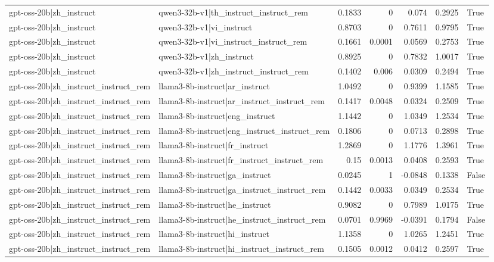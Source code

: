 \begin{table}
\begin{tabular}{l l r r r r l}
gpt-oss-20b|zh_instruct & qwen3-32b-v1|th_instruct_instruct_rem & 0.1833 & 0 & 0.074 & 0.2925 & True \\
gpt-oss-20b|zh_instruct & qwen3-32b-v1|vi_instruct & 0.8703 & 0 & 0.7611 & 0.9795 & True \\
gpt-oss-20b|zh_instruct & qwen3-32b-v1|vi_instruct_instruct_rem & 0.1661 & 0.0001 & 0.0569 & 0.2753 & True \\
gpt-oss-20b|zh_instruct & qwen3-32b-v1|zh_instruct & 0.8925 & 0 & 0.7832 & 1.0017 & True \\
gpt-oss-20b|zh_instruct & qwen3-32b-v1|zh_instruct_instruct_rem & 0.1402 & 0.006 & 0.0309 & 0.2494 & True \\
gpt-oss-20b|zh_instruct_instruct_rem & llama3-8b-instruct|ar_instruct & 1.0492 & 0 & 0.9399 & 1.1585 & True \\
gpt-oss-20b|zh_instruct_instruct_rem & llama3-8b-instruct|ar_instruct_instruct_rem & 0.1417 & 0.0048 & 0.0324 & 0.2509 & True \\
gpt-oss-20b|zh_instruct_instruct_rem & llama3-8b-instruct|eng_instruct & 1.1442 & 0 & 1.0349 & 1.2534 & True \\
gpt-oss-20b|zh_instruct_instruct_rem & llama3-8b-instruct|eng_instruct_instruct_rem & 0.1806 & 0 & 0.0713 & 0.2898 & True \\
gpt-oss-20b|zh_instruct_instruct_rem & llama3-8b-instruct|fr_instruct & 1.2869 & 0 & 1.1776 & 1.3961 & True \\
gpt-oss-20b|zh_instruct_instruct_rem & llama3-8b-instruct|fr_instruct_instruct_rem & 0.15 & 0.0013 & 0.0408 & 0.2593 & True \\
gpt-oss-20b|zh_instruct_instruct_rem & llama3-8b-instruct|ga_instruct & 0.0245 & 1 & -0.0848 & 0.1338 & False \\
gpt-oss-20b|zh_instruct_instruct_rem & llama3-8b-instruct|ga_instruct_instruct_rem & 0.1442 & 0.0033 & 0.0349 & 0.2534 & True \\
gpt-oss-20b|zh_instruct_instruct_rem & llama3-8b-instruct|he_instruct & 0.9082 & 0 & 0.7989 & 1.0175 & True \\
gpt-oss-20b|zh_instruct_instruct_rem & llama3-8b-instruct|he_instruct_instruct_rem & 0.0701 & 0.9969 & -0.0391 & 0.1794 & False \\
gpt-oss-20b|zh_instruct_instruct_rem & llama3-8b-instruct|hi_instruct & 1.1358 & 0 & 1.0265 & 1.2451 & True \\
gpt-oss-20b|zh_instruct_instruct_rem & llama3-8b-instruct|hi_instruct_instruct_rem & 0.1505 & 0.0012 & 0.0412 & 0.2597 & True \\

\end{tabular}
\end{table}
